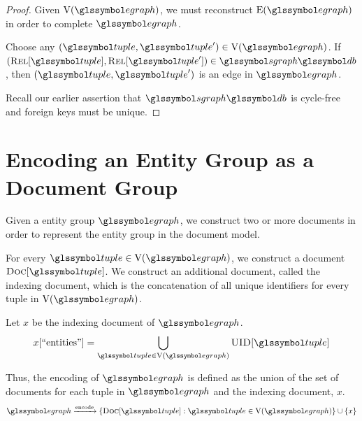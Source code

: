 		\begin{proof}
			Given \(\text{V}(\egraph)\), we must reconstruct \(\text{E}(\egraph)\) in order to complete \(\egraph\).
			
			Choose any \((\tuple, \tuple') \in \text{V}(\egraph)\).	If \((\relations{\tuple}, \relations{\tuple'}) \in \sgraph{\db}\), then \((\tuple, \tuple')\) is an edge in \(\egraph\).
			
			Recall our earlier assertion that \(\sgraph{\db}\) is cycle-free and foreign keys must be unique.
		\end{proof}
		
	\section{Encoding an Entity Group as a Document Group}
	\label{sec:encoding-entity-group-as-document-group}
		Given a entity group \(\egraph\), we construct two or more documents in order to represent the entity group in the document model.
		
		For every \(\tuple \in \text{V}(\egraph)\), we construct a document \(\docs{\tuple}\).  We construct an additional document, called the indexing document, which is the concatenation of all unique identifiers for every tuple in \(\text{V}(\egraph)\).
		
		Let \(x\) be the indexing document of \(\egraph\).
		\begin{align}
			x[\text{``entities''}] = \bigcup_{\tuple \in \text{V}\left(\egraph\right)} \uid{\tuple}
		\end{align}
		
		Thus, the encoding of \(\egraph\) is defined as the union of the set of documents for each tuple in \(\egraph\) and the indexing document, \(x\).
		\begin{align}
			\egraph \xrightarrow{\text{encode}} \{\docs{\tuple} : \tuple \in \text{V}(\egraph)\} \cup \{x\}
		\end{align}
		
